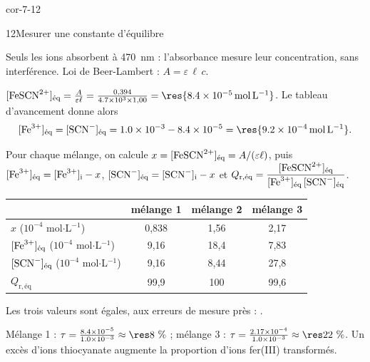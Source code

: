 \begin{blocLivre}{cor-7-12}
\begin{corrige}{12}{Mesurer une constante d'équilibre}
\begin{questions}
\item Seuls les ions  absorbent à 470~nm : l'absorbance mesure leur concentration, sans interférence.
Loi de Beer-Lambert : $A=\varepsilon\,\ell\,c$.
\item $[\ce{FeSCN^2+}]_\text{éq}=\frac{A}{\varepsilon\ell}=\frac{0{,}394}{\num{4.7e3}\times1{,}00}=\res{\qty{8,4e-5}{mol.L^{-1}}}$. Le tableau
d'avancement donne alors
\[[\ce{Fe^3+}]_\text{éq}=[\ce{SCN-}]_\text{éq}=\num{1.0e-3}-\num{8.4e-5}=\res{\qty{9,2e-4}{mol.L^{-1}}}.\]
\item Pour chaque mélange, on calcule \mbox{$x=[\ce{FeSCN^2+}]_\text{éq}=A/(\varepsilon\ell)$}, puis
\mbox{$[\ce{Fe^3+}]_\text{éq}=[\ce{Fe^3+}]_\mathrm{i}-x$}, \mbox{$[\ce{SCN-}]_\text{éq}=[\ce{SCN-}]_\mathrm{i}-x$} et
$Q_{\mathrm{r},\text{éq}}=\dfrac{[\ce{FeSCN^2+}]_\text{éq}}{[\ce{Fe^3+}]_\text{éq}\,[\ce{SCN-}]_\text{éq}}$.
\begin{center}\small\renewcommand{\arraystretch}{1.2}
\begin{tabular}{@{}l*{3}{c}@{}}\toprule
 & mélange 1 & mélange 2 & mélange 3\\\midrule
$x$ ($10^{-4}$ mol$\cdot$L$^{-1}$) & 0,838 & 1,56 & 2,17\\
$[\ce{Fe^3+}]_\text{éq}$ ($10^{-4}$ mol$\cdot$L$^{-1}$) & 9,16 & 18,4 & 7,83\\
$[\ce{SCN-}]_\text{éq}$ ($10^{-4}$ mol$\cdot$L$^{-1}$) & 9,16 & 8,44 & 27,8\\
$Q_{\mathrm{r},\text{éq}}$ & 99,9 & 100 & 99,6\\\bottomrule
\end{tabular}\end{center}
Les trois valeurs sont égales, aux erreurs de mesure près : .
\item Mélange 1 : $\tau=\frac{\num{8.4e-5}}{\num{1.0e-3}}\approx\res{8~\%}$ ; mélange 3 : $\tau=\frac{\num{2.17e-4}}{\num{1.0e-3}}\approx\res{22~\%}$.
Un excès d'ions thiocyanate augmente la proportion d'ions fer(III) transformés.
\end{questions}
\end{corrige}
\end{blocLivre}

